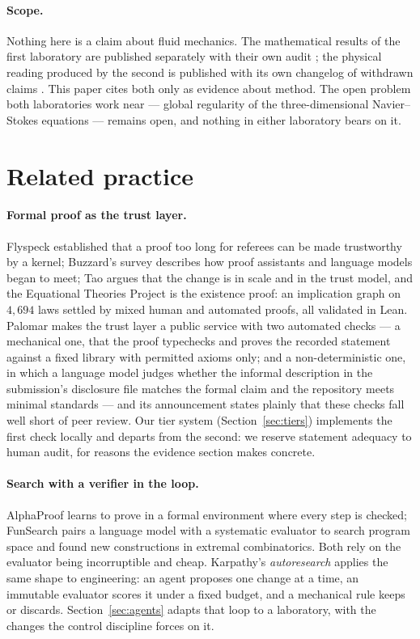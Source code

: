 \documentclass[11pt]{article}
\begin{document}
\paragraph{Scope.} Nothing here is a claim about fluid mechanics. The mathematical results of
the first laboratory are published separately with their own audit \cite{socrateai2026triad};
the physical reading produced by the second is published with its own changelog of withdrawn
claims \cite{callens2026reading}. This paper cites both only as evidence about method. The
open problem both laboratories work near --- global regularity of the three-dimensional
Navier--Stokes equations --- remains open, and nothing in either laboratory bears on it.

\section{Related practice}
\label{sec:related}

\paragraph{Formal proof as the trust layer.} Flyspeck \cite{hales2017} established that a
proof too long for referees can be made trustworthy by a kernel; Buzzard's survey
\cite{buzzard2024} describes how proof assistants and language models began to meet; Tao
\cite{tao2025} argues that the change is in scale and in the trust model, and the Equational
Theories Project \cite{etp2025} is the existence proof: an implication graph on $4{,}694$
laws settled by mixed human and automated proofs, all validated in Lean. Palomar
\cite{palomar2026} makes the trust layer a public service with two automated checks --- a
mechanical one, that the proof typechecks and proves the recorded statement against a fixed
library with permitted axioms only; and a non-deterministic one, in which a language model
judges whether the informal description in the submission's disclosure file matches the
formal claim and the repository meets minimal standards --- and its announcement states
plainly that these checks fall well short of peer review. Our tier system (Section~\ref{sec:tiers}) implements the first check
locally and departs from the second: we reserve statement adequacy to human audit, for reasons
the evidence section makes concrete.

\paragraph{Search with a verifier in the loop.} AlphaProof \cite{alphaproof2025} learns to
prove in a formal environment where every step is checked; FunSearch \cite{funsearch2024}
pairs a language model with a systematic evaluator to search program space and found new
constructions in extremal combinatorics. Both rely on the evaluator being incorruptible and
cheap. Karpathy's \emph{autoresearch} \cite{karpathy2026} applies the same shape to
engineering: an agent proposes one change at a time, an immutable evaluator scores it under a
fixed budget, and a mechanical rule keeps or discards. Section~\ref{sec:agents} adapts that
loop to a laboratory, with the changes the control discipline forces on it.
\end{document}
